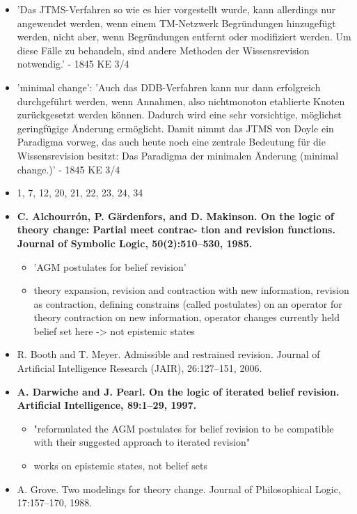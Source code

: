 \documentclass[11pt]{article}
\begin{document}
\begin{itemize}
\begin{itemize}
\begin{itemize}
        \end{itemize}
        \item 'Das JTMS-Verfahren so wie es hier vorgestellt wurde, kann allerdings nur angewendet werden, wenn einem TM-Netzwerk Begründungen hinzugefügt werden, nicht aber, wenn Begründungen entfernt oder modifiziert werden. Um diese Fälle zu behandeln, sind andere Methoden der Wissensrevision notwendig.' - 1845 KE 3/4
        \item 'minimal change': 'Auch das DDB-Verfahren kann nur dann erfolgreich durchgeführt werden, wenn Annahmen, also nichtmonoton etablierte Knoten zurückgesetzt werden können. Dadurch wird eine sehr vorsichtige, möglichst geringfügige Änderung ermöglicht. Damit nimmt das JTMS von Doyle ein Paradigma vorweg, das auch heute noch eine zentrale Bedeutung für die Wissensrevision besitzt: Das Paradigma der minimalen Änderung (minimal change.)' - 1845 KE 3/4
        \item 1, 7, 12, 20, 21, 22, 23, 24, 34
        \item \textbf{C. Alchourrón, P. Gärdenfors, and D. Makinson. On the logic of theory change: Partial meet contrac- tion and revision functions. Journal of Symbolic Logic, 50(2):510–530, 1985.}
        \begin{itemize}
            \item 'AGM postulates for belief revision'
            \item theory expansion, revision and contraction with new information, revision as contraction, defining constrains (called postulates) on an operator for theory contraction on new information, operator changes currently held belief set here -> not epistemic states
        \end{itemize}
        \item R. Booth and T. Meyer. Admissible and restrained revision. Journal of Artificial Intelligence Research (JAIR), 26:127–151, 2006.
        \item \textbf{A. Darwiche and J. Pearl. On the logic of iterated belief revision. Artificial Intelligence, 89:1–29, 1997.}
        \begin{itemize}
            \item "reformulated the AGM postulates for belief revision to be compatible with their suggested approach to iterated revision"
            \item works on epistemic states, not belief sets
        \end{itemize}
        \item A. Grove. Two modelings for theory change. Journal of Philosophical Logic, 17:157–170, 1988.

\end{itemize}
\end{itemize}
\end{document}
